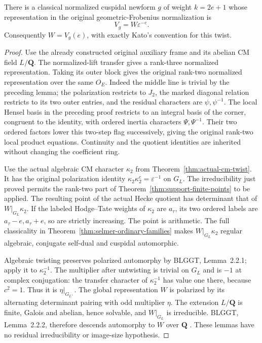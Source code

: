 \begin{lemma}
\label{lem:support-type-two-newform}
There is a classical normalized cuspidal newform $g$ of weight
$k=2e+1$ whose representation in the original geometric-Frobenius
normalization is
\[
                       V_g=W\varepsilon^{-e}.                  \tag{RR4}
\]
Consequently $W=V_g(e)$, with exactly Kato's convention for this twist.
\end{lemma}

\begin{proof}
Use the already constructed original auxiliary frame and its abelian
CM field $L/\mathbf Q$.  The normalized-lift transfer gives a
rank-three normalized representation.  Taking its outer block gives
the original rank-two normalized representation over the same $O_E$.
Indeed the middle line is trivial by the preceding lemma; the
polarization restricts to $J_2$, the marked diagonal relation
restricts to its two outer entries, and the residual characters are
$\psi,\psi^{-1}$.  The local Hensel basis in the preceding proof
restricts to an integral basis of the corner, congruent to the
identity, with ordered inertia characters $\Psi,\Psi^{-1}$.
Their two ordered factors lower this two-step flag successively,
giving the original rank-two local product equations.  Continuity
and the quotient identities are inherited without changing the
coefficient ring.

Use the actual algebraic CM character $\kappa_2$ from
Theorem~\ref{thm:actual-cm-twist}.  It has the original polarization
identity $\kappa_2\kappa_2^c=\varepsilon^{-1}$ on $G_L$.
The irreducibility just proved permits the rank-two part of
Theorem~\ref{thm:support-finite-points} to be applied.  The resulting
point of the actual Hecke quotient has determinant that of
$W|_{G_L}\kappa_2$.  If the labeled Hodge--Tate weights of
$\kappa_2$ are $a_\tau$, its two ordered labels are
$a_\tau-e,a_\tau+e$, so are strictly increasing.  The point is
arithmetic.  The full classicality in
Theorem~\ref{thm:selmer-ordinary-families} makes
$W|_{G_L}\kappa_2$ regular algebraic, conjugate self-dual and
cuspidal automorphic.

Algebraic twisting preserves polarized automorphy by
BLGGT, Lemma~2.2.1; apply it to $\kappa_2^{-1}$.
The multiplier after untwisting is trivial on $G_L$ and is $-1$
at complex conjugation: the transfer character of $\kappa_2^{-1}$
has value one there, because $c^2=1$.  Thus it is
$\eta|_{G_{L^+}}$.
The global representation $W$ is polarized by its alternating
determinant pairing with odd multiplier $\eta$.
The extension $L/\mathbf Q$ is finite, Galois and abelian, hence
solvable, and $W|_{G_L}$ is irreducible.  BLGGT, Lemma~2.2.2,
therefore descends automorphy to $W$ over $\mathbf Q$
\cite{support-type-two-blggt}.  These lemmas have no residual
irreducibility or image-size hypothesis.


\end{proof}
